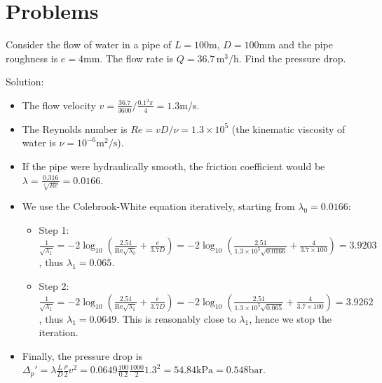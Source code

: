 \section{Problems}


Consider the flow of water in a pipe of $L=100$m, $D=100$mm and the pipe roughness is $e=4$mm. The flow rate is $Q=36.7\,\mathrm{m^3/h}$. Find the pressure drop.

\noindent Solution:
%
\begin{itemize}
\item The flow velocity $v=\frac{36.7}{3600} / \frac{0.1^2\pi}{4}=1.3$m/s.
\item The Reynolds number is $Re=vD/\nu=1.3\times 10^{5}$ (the kinematic viscosity of water is $\nu=10^{-6}\mathrm{m^2/s}$).
\item If the pipe were hydraulically smooth, the friction coefficient would be $\lambda=\frac{0.316}{\sqrt[4]{Re}}=0.0166$.
\item We use the Colebrook-White equation iteratively, starting from $\lambda_0=0.0166$:
	\begin{itemize}
		\item Step 1: $\frac{1}{\sqrt{\lambda_1}}=-2\log_{10}\left(\frac{2.51}{\mathrm{Re}\sqrt{\lambda_0}}+\frac{e}{3.7D}\right)=-2\log_{10}\left(\frac{2.51}{\mathrm{1.3\times 10^{5}}\sqrt{0.0166}}+\frac{4}{3.7\times100}\right)=3.9203$, thus $\lambda_1=0.065$.
		\item Step 2:$\frac{1}{\sqrt{\lambda_1}}=-2\log_{10}\left(\frac{2.51}{\mathrm{Re}\sqrt{\lambda_1}}+\frac{e}{3.7D}\right)=-2\log_{10}\left(\frac{2.51}{\mathrm{1.3\times 10^{5}}\sqrt{0.065}}+\frac{4}{3.7\times100}\right)=3.9262$, thus $\lambda_1=0.0649$. This is reasonably close to $\lambda_1$, hence we stop the iteration.
	\end{itemize}
\item Finally, the pressure drop is $\Delta_p'=\lambda \frac{L}{D}\frac{\rho}{2}v^2=0.0649\frac{100}{0.2}\frac{1000}{2}1.3^2=54.84\mathrm{kPa}=0.548\mathrm{bar}$.
\end{itemize}




